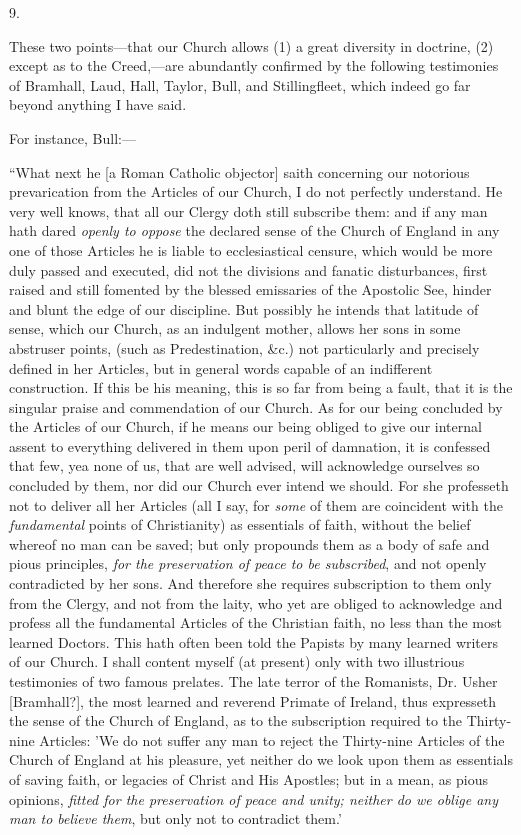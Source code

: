 9.

These two points—that our Church allows (1) a
great diversity in doctrine, (2) except as to the Creed,—are
abundantly confirmed by the following testimonies of Bramhall, Laud,
Hall, Taylor, Bull, and Stillingfleet, which indeed go far beyond
anything I have said.

For instance, Bull:—

``What
next he [a Roman Catholic objector] saith concerning our notorious
prevarication from the Articles of our Church, I do not perfectly
understand. He very well knows, that all our Clergy doth still
subscribe them: and if any man hath dared \emph{openly to oppose} the
declared sense of the Church of
England in any one of those Articles he is liable to ecclesiastical
censure, which would be more duly passed and executed, did not the
divisions and fanatic disturbances, first raised and still fomented by
the blessed emissaries of the Apostolic See, hinder and blunt the edge
of our discipline. But possibly he intends that latitude of sense,
which our Church, as an indulgent mother, allows her sons in some
abstruser points, (such as Predestination, \&c.) not particularly
and precisely defined in her Articles, but in general words capable of
an indifferent construction. If this be his meaning, this is so far
from being a fault, that it is the singular praise and commendation of
our Church. As for our being concluded by the Articles of our Church,
if he means our being obliged to give our internal assent to
everything delivered in them upon peril of damnation, it is confessed
that few, yea none of us, that are well advised, will acknowledge
ourselves so concluded by them, nor did our Church ever intend we
should. For she professeth not to deliver all her Articles (all I say,
for \emph{some} of them are coincident with the \emph{fundamental}
points of Christianity) as essentials of faith, without the belief
whereof no man can be saved; but only propounds them as a body of safe
and pious principles, \emph{for the preservation of peace to be
subscribed}, and not openly contradicted by her sons. And therefore
she requires subscription to them only from the Clergy, and not from
the laity, who yet are obliged to acknowledge and profess all the
fundamental Articles of the Christian faith, no less than the most
learned Doctors. This hath often been told the Papists by many learned
writers of our Church. I shall content myself (at present) only with
two illustrious testimonies of two famous prelates. The late terror of
the Romanists, Dr. Usher [Bramhall?], the most learned and reverend
Primate of Ireland, thus expresseth the sense of the Church of
England, as to the subscription required to the Thirty-nine Articles:
'We do not suffer any man to reject the Thirty-nine Articles of the
Church of England at his pleasure, yet neither do we look upon them as
essentials of saving faith, or legacies of Christ and His Apostles;
but in a mean, as pious opinions, \emph{fitted for the preservation of
peace and unity; neither do we oblige any man to believe them}, but
only not to contradict them.'

